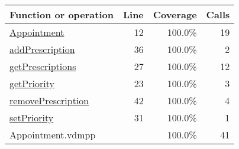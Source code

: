 \begin{longtable}{|l|r|r|r|}
\hline
Function or operation & Line & Coverage & Calls \\
\hline
\hline
\hyperref[Appointment:12]{Appointment} & 12&100.0\% & 19 \\
\hline
\hyperref[addPrescription:36]{addPrescription} & 36&100.0\% & 2 \\
\hline
\hyperref[getPrescriptions:27]{getPrescriptions} & 27&100.0\% & 12 \\
\hline
\hyperref[getPriority:23]{getPriority} & 23&100.0\% & 3 \\
\hline
\hyperref[removePrescription:42]{removePrescription} & 42&100.0\% & 4 \\
\hline
\hyperref[setPriority:31]{setPriority} & 31&100.0\% & 1 \\
\hline
\hline
Appointment.vdmpp & & 100.0\% & 41 \\
\hline
\end{longtable}

